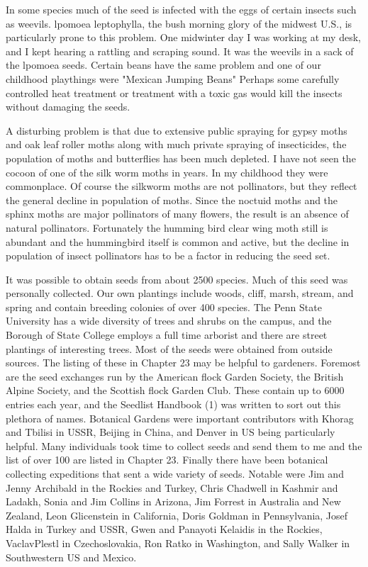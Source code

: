 In some species much of the seed is infected with the eggs of certain insects
such as weevils. lpomoea leptophylla, the bush morning glory of the midwest U.S., is
particularly prone to this problem. One midwinter day I was working at my desk, and I
kept hearing a rattling and scraping sound. It was the weevils in a sack of the lpomoea
seeds. Certain beans have the same problem and one of our childhood playthings
were "Mexican Jumping Beans" Perhaps some carefully controlled heat treatment or
treatment with a toxic gas would kill the insects without damaging the seeds.

A disturbing problem is that due to extensive public spraying for gypsy moths
and oak leaf roller moths along with much private spraying of insecticides, the
population of moths and butterflies has been much depleted. I have not seen the
cocoon of one of the silk worm moths in years. In my childhood they were
commonplace. Of course the silkworm moths are not pollinators, but they reflect the
general decline in population of moths. Since the noctuid moths and the sphinx moths
are major pollinators of many flowers, the result is an absence of natural pollinators.
Fortunately the humming bird clear wing moth still is abundant and the hummingbird
itself is common and active, but the decline in population of insect pollinators has to be
a factor in reducing the seed set.

It was possible to obtain seeds from about 2500 species. Much of this seed was
personally collected. Our own plantings include woods, cliff, marsh, stream, and
spring and contain breeding colonies of over 400 species. The Penn State University
has a wide diversity of trees and shrubs on the campus, and the Borough of State
College employs a full time arborist and there are street plantings of interesting trees.
Most of the seeds were obtained from outside sources. The listing of these in
Chapter 23 may be helpful to gardeners. Foremost are the seed exchanges run by the
American flock Garden Society, the British Alpine Society, and the Scottish flock
Garden Club. These contain up to 6000 entries each year, and the Seedlist
Handbook (1) was written to sort out this plethora of names. Botanical Gardens were
important contributors with Khorag and Tbilisi in USSR, Beijing in China, and Denver
in US being particularly helpful. Many individuals took time to collect seeds and send
them to me and the list of over 100 are listed in Chapter 23. Finally there have been
botanical collecting expeditions that sent a wide variety of seeds. Notable were Jim
and Jenny Archibald in the Rockies and Turkey, Chris Chadwell in Kashmir and
Ladakh, Sonia and Jim Collins in Arizona, Jim Forrest in Australia and New Zealand,
Leon Glicenstein in California, Doris Goldman in Pennsylvania, Josef Halda in Turkey
and USSR, Gwen and Panayoti Kelaidis in the Rockies, VaclavPlestl in
Czechoslovakia, Ron Ratko in Washington, and Sally Walker in Southwestern US and
Mexico.


